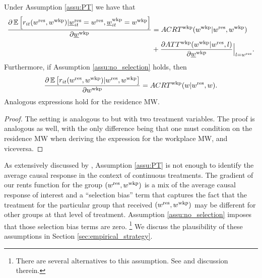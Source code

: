 \begin{prop}[Identification]\label{prop:PO_identification}
    Under Assumption \ref{assu:PT} we have that
    \begin{equation*}
        \begin{split}
        \frac{\partial \operatorname{\mathbb{E}}\left[r_{it}(w^{\text{res}}, w^{\text{wkp}}) 
                              | \underline{w}_{it}^{\text{res}}=w^{\text{res}}, \underline{w}_{it}^{\text{wkp}}=w^{\text{wkp}}\right]}
             {\partial \underline{w}^{\text{wkp}}} 
        & = ACRT^{\text{wkp}}(w^{\text{wkp}} | w^{\text{res}}, w^{\text{wkp}})            \\
        &  + \frac{\partial ATT^{\text{wkp}}(w^{\text{wkp}} | w^{\text{res}}, l)}
                  {\partial \underline{w}^{\text{wkp}}} \Big|_{l = w^{\text{res}}} .    \\
        \end{split}
    \end{equation*}
    Furthermore, if Assumption \ref{assu:no_selection} holds, then
    \begin{equation*}
        \frac{\partial \operatorname{\mathbb{E}}\left[r_{it}(w^{\text{res}}, w^{\text{wkp}}) | w^{\text{res}}, w^{\text{wkp}}\right]}
        {\partial w^{\text{wkp}}} 
       = ACRT^{\text{wkp}}(w | w^{\text{res}}, w) .
    \end{equation*}
    Analogous expressions hold for the residence MW.
\end{prop}
\begin{proof}
    The setting is analogous to \textcite{CallawayEtAl2021} but with two 
    treatment variables.
    The proof is analogous as well, with the only difference being that one 
    must condition on the residence MW when deriving the expression for the 
    workplace MW, and viceversa.
\end{proof}

As extensively discussed by \textcite{CallawayEtAl2021}, Assumption \ref{assu:PT} 
is not enough to identify the average causal response in the context of 
continuous treatments.
The gradient of our rents function for the group $(w^{\text{res}}, w^{\text{wkp}})$ is a mix
of the average causal response of interest and a ``selection bias'' term that
captures the fact that the treatment for the particular group that received
$(w^{\text{res}}, w^{\text{wkp}})$ may be different for other groups at that level of 
treatment.
Assumption \ref{assu:no_selection} imposes that those selection bias
terms are zero.%
\footnote{There are several alternatives to this assumption. 
See \textcite[][Section 3.3]{CallawayEtAl2021} and discussion therein.}
We discuss the plausibility of these assumptions in Section 
\ref{sec:empirical_strategy}.

